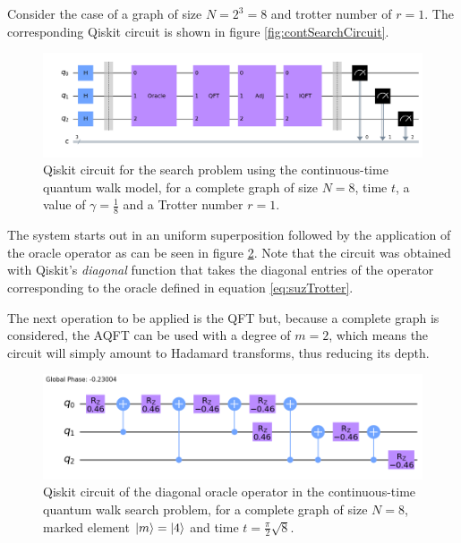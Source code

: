 \documentclass[../../dissertation.tex]{subfiles}
\begin{document}
Consider the case of a graph of size $N=2^3=8$ and trotter number of $r=1$. The
corresponding Qiskit circuit is shown in figure \ref{fig:contSearchCircuit}.
\begin{figure}[!h]
	\centering
	\includegraphics[scale=0.30]{img/Qiskit/ContQuantumWalk/Search/Circuits/circContSearch_N3_S2.png}
	\caption{Qiskit circuit for the search problem using the continuous-time quantum walk model, for a complete graph of size $N=8$, time $t$, a value of $\gamma = \frac{1}{8}$ and a Trotter number $r=1$.}
	\label{fig:contSearchCircQistkit}
\end{figure}
The system starts out in an uniform superposition followed by the application
of the oracle operator as can be seen in figure
\ref{fig:contSearchOracleCircQistkit}. Note that the circuit was obtained with
Qiskit's \textit{diagonal} function that takes the diagonal entries of the
operator corresponding to the oracle defined in equation
\eqref{eq:suzTrotter}.\par

The next operation to be applied is the QFT but, because a complete graph is
considered, the AQFT can be used with a degree of $m=2$, which means the
circuit will simply amount to Hadamard transforms, thus reducing its depth.
\begin{figure}[!h]
	\centering
	\includegraphics[scale=0.30]{img/Qiskit/ContQuantumWalk/Search/Circuits/circOracle_N3_S2.png}
	\caption{Qiskit circuit of the  diagonal oracle operator in the continuous-time quantum walk search problem, for a complete graph of size $N=8$, marked element $\ket{m}=\ket{4}$ and time $t=\frac{\pi}{2} \sqrt{8}$.}
	\label{fig:contSearchOracleCircQistkit}
\end{figure}\par
\end{document}

